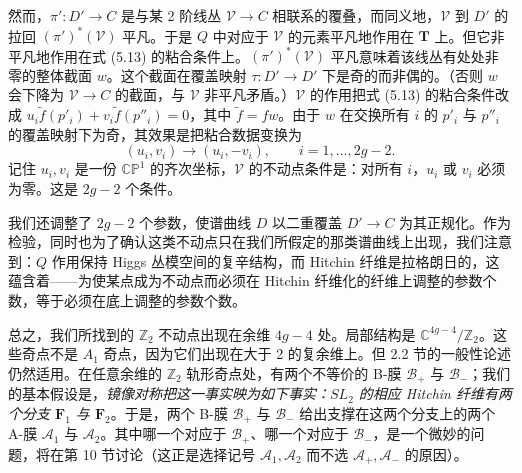 \documentclass[11pt,a4paper]{article}
\begin{document}
然而，$\pi': D'\to C$ 是与某 2 阶线丛 $\mathcal{V}\to C$ 相联系的覆叠，而同义地，$\mathcal{V}$ 到 $D'$ 的拉回 $(\pi')^*(\mathcal{V})$ 平凡。于是 $Q$ 中对应于 $\mathcal{V}$ 的元素平凡地作用在 $\boldsymbol{T}$ 上。但它非平凡地作用在式 (5.13) 的粘合条件上。$(\pi')^*(\mathcal{V})$ 平凡意味着该线丛有处处非零的整体截面 $w$。这个截面在覆盖映射 $\tau: D'\to D'$ 下是奇的而非偶的。（否则 $w$ 会下降为 $\mathcal{V}\to C$ 的截面，与 $\mathcal{V}$ 非平凡矛盾。）$\mathcal{V}$ 的作用把式 (5.13) 的粘合条件改成 $u_i\tilde{f}(p'_i) + v_i\tilde{f}(p''_i) = 0$，其中 $\tilde{f} = f w$。由于 $w$ 在交换所有 $i$ 的 $p'_i$ 与 $p''_i$ 的覆盖映射下为奇，其效果是把粘合数据变换为
\begin{equation}\tag{5.16}
(u_i,v_i)\to (u_i,-v_i),\qquad i=1,\dots,2g-2.
\end{equation}
记住 $u_i,v_i$ 是一份 $\mathbb{CP}^1$ 的齐次坐标，$\mathcal{V}$ 的不动点条件是：对所有 $i$，$u_i$ 或 $v_i$ 必须为零。这是 $2g-2$ 个条件。

我们还调整了 $2g-2$ 个参数，使谱曲线 $D$ 以二重覆盖 $D'\to C$ 为其正规化。作为检验，同时也为了确认这类不动点只在我们所假定的那类谱曲线上出现，我们注意到：$Q$ 作用保持 Higgs 丛模空间的复辛结构，而 Hitchin 纤维是拉格朗日的，这蕴含着——为使某点成为不动点而必须在 Hitchin 纤维化的纤维上调整的参数个数，等于必须在底上调整的参数个数。


总之，我们所找到的 $\mathbb{Z}_2$ 不动点出现在余维 $4g-4$ 处。局部结构是 $\mathbb{C}^{4g-4}/\mathbb{Z}_2$。这些奇点不是 $A_1$ 奇点，因为它们出现在大于 2 的复余维上。但 2.2 节的一般性论述仍然适用。在任意余维的 $\mathbb{Z}_2$ 轨形奇点处，有两个不等价的 B-膜 $\mathcal{B}_+$ 与 $\mathcal{B}_-$；我们的基本假设是，\emph{镜像对称把这一事实映为如下事实：$SL_2$ 的相应 Hitchin 纤维有两个分支 $\boldsymbol{F}_1$ 与 $\boldsymbol{F}_2$}。于是，两个 B-膜 $\mathcal{B}_+$ 与 $\mathcal{B}_-$ 给出支撑在这两个分支上的两个 A-膜 $\mathcal{A}_1$ 与 $\mathcal{A}_2$。其中哪一个对应于 $\mathcal{B}_+$、哪一个对应于 $\mathcal{B}_-$，是一个微妙的问题，将在第 10 节讨论（这正是选择记号 $\mathcal{A}_1,\mathcal{A}_2$ 而不选 $\mathcal{A}_+,\mathcal{A}_-$ 的原因）。
\end{document}

